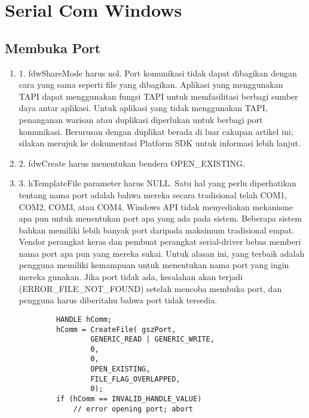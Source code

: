 \section{Serial Com Windows}
	\subsection{Membuka Port}
		\begin{enumerate} 
			Dokumentasi SDK Platform menyatakan bahwa ketika membuka port komunikasi, panggilan ke CreateFile memiliki persyaratan berikut:
				\item 1. fdwShareMode harus nol. Port komunikasi tidak dapat dibagikan dengan cara yang sama seperti file yang dibagikan. Aplikasi yang menggunakan TAPI dapat menggunakan fungsi TAPI untuk memfasilitasi berbagi sumber daya antar aplikasi. Untuk aplikasi yang tidak menggunakan TAPI, penanganan warisan atau duplikasi diperlukan untuk berbagi port komunikasi. Berurusan dengan duplikat berada di luar cakupan artikel ini; silakan merujuk ke dokumentasi Platform SDK untuk informasi lebih lanjut.
				\item 2. fdwCreate harus menentukan bendera OPEN_EXISTING.
				\item 3. hTemplateFile parameter harus NULL.
			Satu hal yang perlu diperhatikan tentang nama port adalah bahwa mereka secara tradisional telah COM1, COM2, COM3, atau COM4. Windows API tidak menyediakan mekanisme apa pun untuk menentukan port apa yang ada pada sistem. Beberapa sistem bahkan memiliki lebih banyak port daripada maksimum tradisional empat. Vendor perangkat keras dan pembuat perangkat serial-driver bebas memberi nama port apa pun yang mereka sukai. Untuk alasan ini, yang terbaik adalah pengguna memiliki kemampuan untuk menentukan nama port yang ingin mereka gunakan. Jika port tidak ada, kesalahan akan terjadi (ERROR_FILE_NOT_FOUND) setelah mencoba membuka port, dan pengguna harus diberitahu bahwa port tidak tersedia.
		\end{enumerate}
		\begin{verbatim}
			HANDLE hComm;
			hComm = CreateFile( gszPort,  
                    GENERIC_READ | GENERIC_WRITE, 
                    0, 
                    0, 
                    OPEN_EXISTING,
                    FILE_FLAG_OVERLAPPED,
                    0);
			if (hComm == INVALID_HANDLE_VALUE)
				// error opening port; abort
		\end{verbatim}
